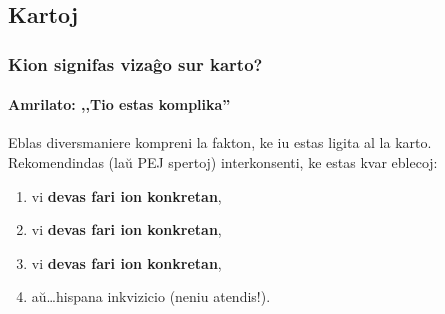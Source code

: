 \subsection{Kartoj}
  \begin{frame}
    \frametitle{Kion signifas vizaĝo sur karto?}
    \framesubtitle{Amrilato: ,,Tio estas komplika''}

	Eblas diversmaniere kompreni la fakton, ke iu estas ligita al la karto. Rekomendindas (laŭ PEJ spertoj) interkonsenti, ke estas kvar eblecoj:
	\begin{enumerate}
		\item vi \textbf{devas fari ion konkretan},
		\item vi \textbf{devas fari ion konkretan},
		\item vi \textbf{devas fari ion konkretan},
		\pause
		\item aŭ\dots \pause hispana inkvizicio \alert{(neniu atendis!)}.
	\end{enumerate}

  \end{frame}


